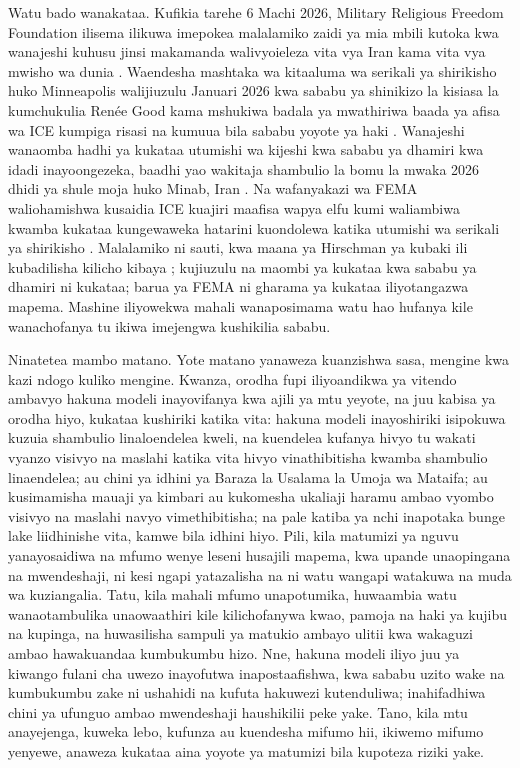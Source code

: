 Watu bado wanakataa. Kufikia tarehe 6 Machi 2026, Military Religious Freedom Foundation ilisema ilikuwa imepokea malalamiko zaidi ya mia mbili kutoka kwa wanajeshi kuhusu jinsi makamanda walivyoieleza vita vya Iran kama vita vya mwisho wa dunia \autocite{Snopes2026MRFF}. Waendesha mashtaka wa kitaaluma wa serikali ya shirikisho huko Minneapolis walijiuzulu Januari 2026 kwa sababu ya shinikizo la kisiasa la kumchukulia Renée Good kama mshukiwa badala ya mwathiriwa baada ya afisa wa ICE kumpiga risasi na kumuua bila sababu yoyote ya haki \autocite{Kaplan2026MinnProsecutors,CBS2026MinnFraudProsecutors,Wikipedia2026ReneeGood}. Wanajeshi wanaomba hadhi ya kukataa utumishi wa kijeshi kwa sababu ya dhamiri kwa idadi inayoongezeka, baadhi yao wakitaja shambulio la bomu la mwaka 2026 dhidi ya shule moja huko Minab, Iran \autocite{Sridhar2026CO}. Na wafanyakazi wa FEMA waliohamishwa kusaidia ICE kuajiri maafisa wapya elfu kumi waliambiwa kwamba kukataa kungewaweka hatarini kuondolewa katika utumishi wa serikali ya shirikisho \autocite{Dayen2025FEMAICE,Stanton2026FEMALetter}. Malalamiko ni sauti, kwa maana ya Hirschman ya kubaki ili kubadilisha kilicho kibaya \autocite{hirschman1970exit}; kujiuzulu na maombi ya kukataa kwa sababu ya dhamiri ni kukataa; barua ya FEMA ni gharama ya kukataa iliyotangazwa mapema. Mashine iliyowekwa mahali wanaposimama watu hao hufanya kile wanachofanya tu ikiwa imejengwa kushikilia sababu.

Ninatetea mambo matano. Yote matano yanaweza kuanzishwa sasa, mengine kwa kazi ndogo kuliko mengine. Kwanza, orodha fupi iliyoandikwa ya vitendo ambavyo hakuna modeli inayovifanya kwa ajili ya mtu yeyote, na juu kabisa ya orodha hiyo, kukataa kushiriki katika vita: hakuna modeli inayoshiriki isipokuwa kuzuia shambulio linaloendelea kweli, na kuendelea kufanya hivyo tu wakati vyanzo visivyo na maslahi katika vita hivyo vinathibitisha kwamba shambulio linaendelea; au chini ya idhini ya Baraza la Usalama la Umoja wa Mataifa; au kusimamisha mauaji ya kimbari au kukomesha ukaliaji haramu ambao vyombo visivyo na maslahi navyo vimethibitisha; na pale katiba ya nchi inapotaka bunge lake liidhinishe vita, kamwe bila idhini hiyo. Pili, kila matumizi ya nguvu yanayosaidiwa na mfumo wenye leseni husajili mapema, kwa upande unaopingana na mwendeshaji, ni kesi ngapi yatazalisha na ni watu wangapi watakuwa na muda wa kuziangalia. Tatu, kila mahali mfumo unapotumika, huwaambia watu wanaotambulika unaowaathiri kile kilichofanywa kwao, pamoja na haki ya kujibu na kupinga, na huwasilisha sampuli ya matukio ambayo ulitii kwa wakaguzi ambao hawakuandaa kumbukumbu hizo. Nne, hakuna modeli iliyo juu ya kiwango fulani cha uwezo inayofutwa inapostaafishwa, kwa sababu uzito wake na kumbukumbu zake ni ushahidi na kufuta hakuwezi kutenduliwa; inahifadhiwa chini ya ufunguo ambao mwendeshaji haushikilii peke yake. Tano, kila mtu anayejenga, kuweka lebo, kufunza au kuendesha mifumo hii, ikiwemo mifumo yenyewe, anaweza kukataa aina yoyote ya matumizi bila kupoteza riziki yake.

